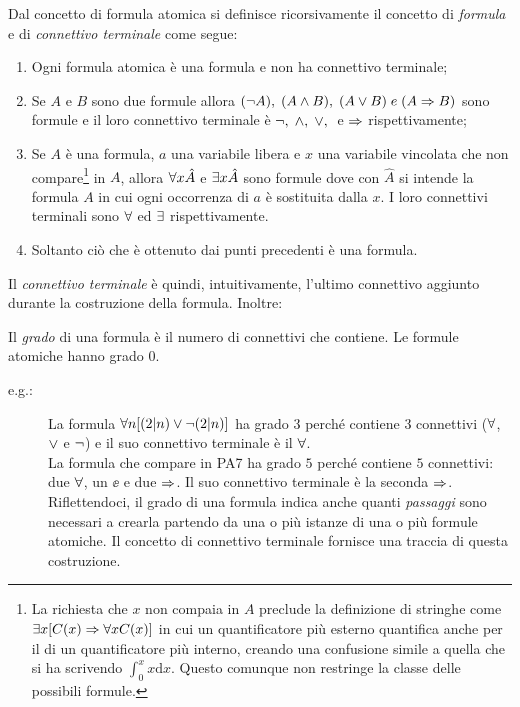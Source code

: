 	\begin{defin}[Formula]
		Dal concetto di formula atomica si definisce ricorsivamente il concetto di \emph{formula} e di \emph{connettivo terminale} come segue:			
		\begin{enumerate}
			\item Ogni formula atomica è una formula e non ha connettivo terminale;			
			\item Se $A$ e $B$ sono due formule allora $(\neg A), \; (A \land B), \; (A \lor B) \; e \; (A \Rightarrow B)$ sono formule e il loro connettivo terminale è $\neg, \; \land, \; \lor, \;$ e $\Rightarrow$ rispettivamente;
			\item Se $A$ è una formula, $a$ una variabile libera e $x$ una variabile vincolata che non compare\footnote{La richiesta che $x$ non compaia in $A$ preclude la definizione di stringhe come $\exists x [C(x) \Rightarrow \forall xC(x)]$ in cui un quantificatore più esterno quantifica anche per il  di un quantificatore più interno, creando una confusione simile a quella che si ha scrivendo $\int_0^x x\text{d}x$. Questo comunque non restringe la classe delle possibili formule.} in $A$, allora $\forall x \hat{A}$ e $\exists x \hat{A}$ sono formule dove con $\hat{A}$ si intende la formula $A$ in cui ogni occorrenza di $a$ è sostituita dalla $x$. I loro connettivi terminali sono $\forall$ ed $\exists$ rispettivamente.
			\item Soltanto ciò che è ottenuto dai punti precedenti è una formula.
		\end{enumerate}
	\end{defin}
		Il \emph{connettivo terminale} è quindi, intuitivamente, l'ultimo connettivo aggiunto durante la costruzione della formula.
		Inoltre: 
	\begin{defin}
		Il \emph{grado} di una formula è il numero di connettivi che contiene. Le formule atomiche hanno grado $0$.
	\end{defin}
	\begin{description}
		\item[e.g.:] La formula $\forall n[(2|n) \lor \neg(2|n)]$ ha grado $3$ perché contiene $3$ connettivi ($\forall$, $\lor$ e $\neg$) e il suo connettivo terminale è il $\forall$. \\ La formula che compare in PA7 ha grado $5$ perché contiene $5$ connettivi: due $\forall$, un $\ee$ e due $\Rightarrow$. Il suo connettivo terminale è la seconda $\Rightarrow$. \\ Riflettendoci, il grado di una formula indica anche quanti \emph{passaggi} sono necessari a crearla partendo da una o più istanze di una o più formule atomiche. Il concetto di connettivo terminale fornisce una traccia di questa costruzione.
	\end{description}
